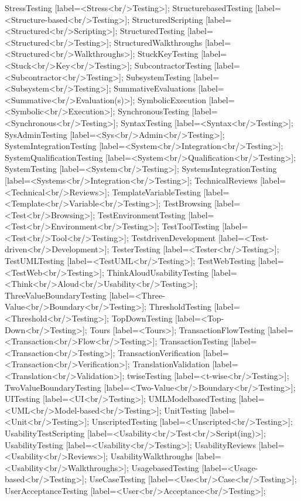 \documentclass{article}
\begin{document}
{StressTesting [label=<Stress<br/>Testing>];
StructurebasedTesting [label=<Structure-based<br/>Testing>];
StructuredScripting [label=<Structured<br/>Scripting>];
StructuredTesting [label=<Structured<br/>Testing>];
StructuredWalkthroughs [label=<Structured<br/>Walkthroughs>];
StuckKeyTesting [label=<Stuck<br/>Key<br/>Testing>];
SubcontractorTesting [label=<Subcontractor<br/>Testing>];
SubsystemTesting [label=<Subsystem<br/>Testing>];
SummativeEvaluations [label=<Summative<br/>Evaluation(s)>];
SymbolicExecution [label=<Symbolic<br/>Execution>];
SynchronousTesting [label=<Synchronous<br/>Testing>];
SyntaxTesting [label=<Syntax<br/>Testing>];
SysAdminTesting [label=<Sys<br/>Admin<br/>Testing>];
SystemIntegrationTesting [label=<System<br/>Integration<br/>Testing>];
SystemQualificationTesting [label=<System<br/>Qualification<br/>Testing>];
SystemTesting [label=<System<br/>Testing>];
SystemsIntegrationTesting [label=<Systems<br/>Integration<br/>Testing>];
TechnicalReviews [label=<Technical<br/>Reviews>];
TemplateVariableTesting [label=<Template<br/>Variable<br/>Testing>];
TestBrowsing [label=<Test<br/>Browsing>];
TestEnvironmentTesting [label=<Test<br/>Environment<br/>Testing>];
TestToolTesting [label=<Test<br/>Tool<br/>Testing>];
TestdrivenDevelopment [label=<Test-driven<br/>Development>];
TesterTesting [label=<Tester<br/>Testing>];
TestUMLTesting [label=<TestUML<br/>Testing>];
TestWebTesting [label=<TestWeb<br/>Testing>];
ThinkAloudUsabilityTesting [label=<Think<br/>Aloud<br/>Usability<br/>Testing>];
ThreeValueBoundaryTesting [label=<Three-Value<br/>Boundary<br/>Testing>];
ThresholdTesting [label=<Threshold<br/>Testing>];
TopDownTesting [label=<Top-Down<br/>Testing>];
Tours [label=<Tours>];
TransactionFlowTesting [label=<Transaction<br/>Flow<br/>Testing>];
TransactionTesting [label=<Transaction<br/>Testing>];
TransactionVerification [label=<Transaction<br/>Verification>];
TranslationValidation [label=<Translation<br/>Validation>];
twiseTesting [label=<t-wise<br/>Testing>];
TwoValueBoundaryTesting [label=<Two-Value<br/>Boundary<br/>Testing>];
UITesting [label=<UI<br/>Testing>];
UMLModelbasedTesting [label=<UML<br/>Model-based<br/>Testing>];
UnitTesting [label=<Unit<br/>Testing>];
UnscriptedTesting [label=<Unscripted<br/>Testing>];
UsabilityTestScripting [label=<Usability<br/>Test<br/>Script(ing)>];
UsabilityTesting [label=<Usability<br/>Testing>];
UsabilityReviews [label=<Usability<br/>Reviews>];
UsabilityWalkthroughs [label=<Usability<br/>Walkthroughs>];
UsagebasedTesting [label=<Usage-based<br/>Testing>];
UseCaseTesting [label=<Use<br/>Case<br/>Testing>];
UserAcceptanceTesting [label=<User<br/>Acceptance<br/>Testing>];
}
\end{document}
